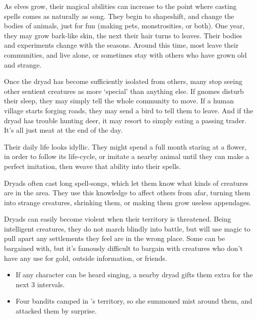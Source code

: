 \begin{multicols}{2}

\noindent
As elves grow, their magical abilities can increase to the point where casting spells comes as naturally as song.
They begin to shapeshift, and change the bodies of animals, just for fun (making pets, monstrosities, or both).
One year, they may grow bark-like skin, the next their hair turns to leaves.
Their bodies and experiments change with the seasons.
Around this time, most leave their communities, and live alone, or sometimes stay with others who have grown old and strange.

Once the \gls{dryad} has become sufficiently isolated from others, many stop seeing other sentient creatures as more `special' than anything else.
If gnomes disturb their sleep, they may simply tell the whole community to move.
If a human \gls{village} starts forging roads, they may send a bird to tell them to leave.
And if the \gls{dryad} has trouble hunting deer, it may resort to simply eating a passing trader.
It's all just meat at the end of the day.

Their daily life looks idyllic.
They might spend a full month staring at a flower, in order to follow its life-cycle, or imitate a nearby animal until they can make a perfect imitation, then weave that ability into their spells.

Dryads often cast long spell-songs, which let them know what kinds of creatures are in the area.
They use this knowledge to affect others from afar, turning them into strange creatures, shrinking them, or making them grow useless appendages.

Dryads can easily become violent when their territory is threatened.
Being intelligent creatures, they do not march blindly into battle, but will use magic to pull apart any settlements they feel are in the wrong place.
Some can be bargained with, but it's famously difficult to bargain with creatures who don't have any use for gold, outside information, or friends.

\dryad

\showStdSpells

\showEnc[\El]

\begin{itemize}

  \item
  If any character can be heard singing, a nearby \gls{dryad} gifts them extra  for the next 3 \glspl{interval}.
  \item
  Four bandits camped in 's territory, so she summoned mist around them, and attacked them by surprise.


\end{itemize}
\end{multicols}
